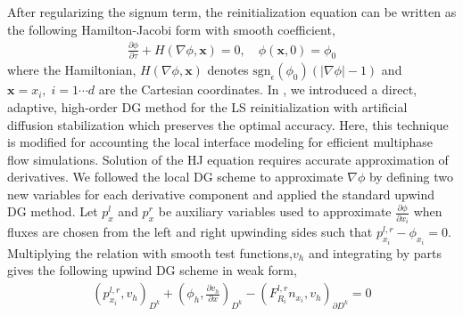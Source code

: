 \documentclass[11pt,a4paper,twoside]{article}
\begin{document}
	
	After regularizing the signum term, the reinitialization equation can be written as the following Hamilton-Jacobi form with smooth coefficient, 
	\begin{equation}
	\begin{aligned}
	\label{Eq.RedistanceHamiltonian}
	\frac{\partial\phi}{\partial\tau}+H(\nabla\phi,\mathbf{x})  =  0, \quad \phi(\mathbf{x},0)  =\phi_{0} 
	\end{aligned}
	\end{equation}
	where the Hamiltonian, $H(\nabla\phi,\mathbf{x})$ denotes $\text{sgn}_{\epsilon} (\phi_{0}) (\lvert \nabla \phi \rvert-1)$ and  $ \mathbf{x} = x_i, \; i=1\cdots d $ are the Cartesian coordinates. In \cite{karakus_reinitialization_2015}, we introduced a direct, adaptive, high-order DG method for the LS reinitialization with artificial diffusion stabilization which preserves the optimal accuracy. Here, this technique is modified for accounting the local interface modeling for efficient multiphase flow simulations. Solution of the HJ equation requires  accurate approximation of derivatives. We followed the local DG scheme \cite{yan_local_2011} to approximate $ \nabla\phi $ by defining  two new variables for each derivative component  and applied the standard upwind DG method. Let $p_{x}^{l}$ and $p_{x}^{r}$ be auxiliary variables used to approximate $\frac{\partial\phi}{\partial x_i}$ when  fluxes are chosen from the left  and right upwinding sides such that $ p_{x_i}^{l,r} -\phi_{x_i} =  0 $. Multiplying the relation with smooth test functions,$ v_h $ and integrating by parts  gives the following upwind DG scheme in weak form, 
	\begin{equation}
	\label{Eq.RedistanceWeakForm}
	\begin{aligned}
	(p_{x_i}^{l,r}, v_h)_{D^{k}}+(\phi_h,\frac{\partial v_h}{\partial x})_{D^{k}}-(F_{R_i}^{l,r} n_{x_i},v_h )_{\partial D^{k}}  = 0
	\end{aligned}
	\end{equation}
\end{document}
